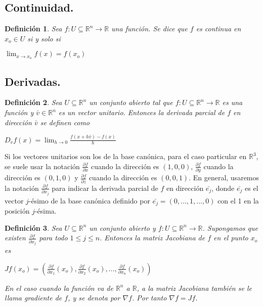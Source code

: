 \documentclass{book}
\newtheorem{definition}{Definición}[section]
\begin{document}
\subsection{Continuidad.}
\begin{definition}
Sea $f:U \subseteq \mathbb{R}^n \rightarrow \mathbb{R}$ una función. Se dice que $f$ es continua en $x_o\in U$ si y solo si
\begin{center}
       $\displaystyle \lim_{x \to x_o}f(x)=f(x_o)$
\end{center}
\end{definition}
\subsection{Derivadas.}
\begin{definition}
Sea $U \subseteq \mathbb{R}^n$ un conjunto abierto tal que  $f:U \subseteq \mathbb{R}^n \rightarrow \mathbb{R}$ es una función y $\bar{v}\in \mathbb{R}^n$ es un vector unitario. Entonces la derivada parcial  de $f$ en dirección $\bar{v}$  se definen como
\\
\begin{center}
$D_v f(x)=\displaystyle \lim_{h \to 0}\frac{f(x+h\bar{v})-f(x)}{h}$
\end{center}
\end{definition}
Si los vectores unitarios son los de la base canónica, para el caso particular en $\mathbb{R}^3$, se suele usar la notación $\frac{\partial f}{\partial x}$ cuando la dirección es $(1,0,0)$, $\frac{\partial f}{\partial y}$ cuando la dirección es $(0,1,0)$ y $\frac{\partial f}{\partial z}$ cuando la dirección es $(0,0,1)$. En general, usaremos la notación $\frac{\partial f}{\partial x_j}$ para indicar la derivada parcial de $f$ en dirección $\bar{e_j}$, donde $\bar{e_j}$ es el vector $j$-ésimo de la base canónica definido por $\bar{e_j}=(0, ..., 1, ..., 0)$ con el 1 en la posición $j$-ésima.
\begin{definition}
Sea $U \subseteq \mathbb{R}^n$ un conjunto abierto y  $f:U \subseteq \mathbb{R}^n \rightarrow \mathbb{R}$. Supongamos que existen $\frac{\partial f}{\partial x_j}$ para todo $1 \leq j \leq n$. Entonces la matriz Jacobiana de $f$ en el punto $x_o$ es
\begin{center}
    $Jf(x_o)=(\frac{\partial f}{\partial x_1}(x_o),\frac{\partial f}{\partial x_2}(x_o),...,\frac{\partial f}{\partial x_n}(x_o))$
\end{center}
En el caso cuando la función va de $\mathbb{R}^n$ a $\mathbb{R}$, a la matriz Jacobiana también se le llama gradiente de $f$, y se denota por $\nabla f$. Por tanto $\nabla f=Jf$.
\end{definition}
\end{document}
